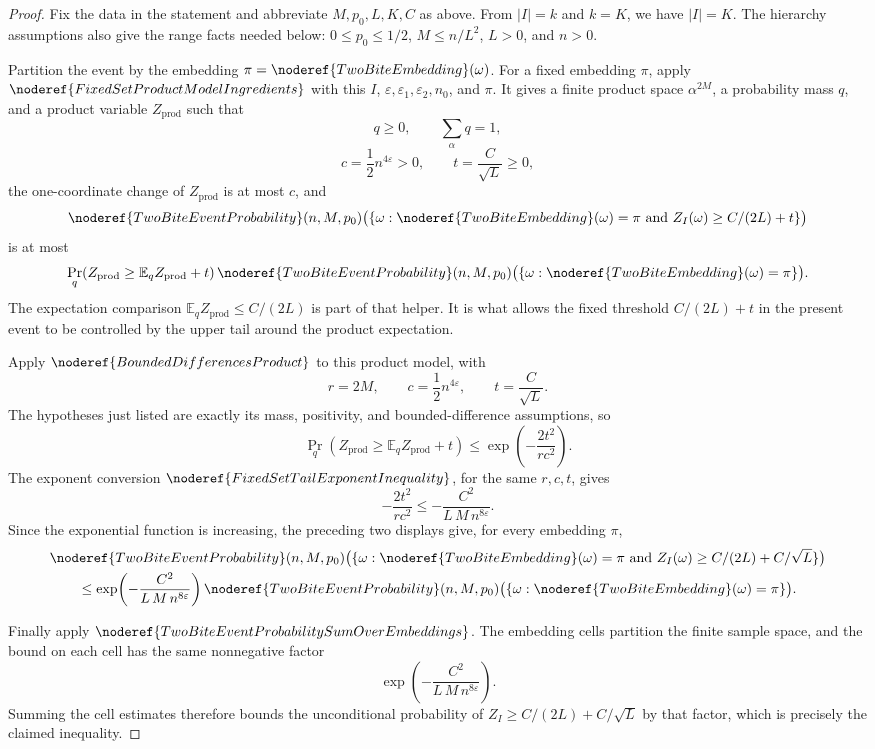 \begin{proof}
Fix the data in the statement and abbreviate \(M,p_0,L,K,C\) as above.  From
\(|I|=k\) and \(k=K\), we have \(|I|=K\).  The hierarchy assumptions also give
the range facts needed below: \(0\le p_0\le 1/2\), \(M\le n/L^2\), \(L>0\),
and \(n>0\).

Partition the event by the embedding
\(\pi=\noderef{TwoBiteEmbedding}(\omega)\).  For a fixed embedding \(\pi\),
apply \(\noderef{FixedSetProductModelIngredients}\) with this \(I\),
\(\varepsilon,\varepsilon_1,\varepsilon_2,n_0\), and \(\pi\).  It gives a
finite product space \(\alpha^{2M}\), a probability mass \(q\), and a product
variable \(Z_{\mathrm{prod}}\) such that
\[
q\ge0,\qquad \sum_{\alpha}q=1,
\]
\[
c=\frac12 n^{4\varepsilon}>0,\qquad t=\frac{C}{\sqrt L}\ge0,
\]
the one-coordinate change of \(Z_{\mathrm{prod}}\) is at most \(c\), and
\[
\noderef{TwoBiteEventProbability}(n,M,p_0)
 \bigl(\{\omega:\noderef{TwoBiteEmbedding}(\omega)=\pi
   \text{ and } Z_I(\omega)\ge C/(2L)+t\}\bigr)
\]
is at most
\[
\Pr_q\!\left(
Z_{\mathrm{prod}}\ge\mathbb E_qZ_{\mathrm{prod}}+t
\right)
\noderef{TwoBiteEventProbability}(n,M,p_0)
 \bigl(\{\omega:\noderef{TwoBiteEmbedding}(\omega)=\pi\}\bigr).
\]
The expectation comparison
\(\mathbb E_qZ_{\mathrm{prod}}\le C/(2L)\) is part of that helper.  It is what
allows the fixed threshold \(C/(2L)+t\) in the present event to be controlled
by the upper tail around the product expectation.

Apply \(\noderef{BoundedDifferencesProduct}\) to this product model, with
\[
r=2M,\qquad c=\frac12 n^{4\varepsilon},\qquad t=\frac{C}{\sqrt L}.
\]
The hypotheses just listed are exactly its mass, positivity, and
bounded-difference assumptions, so
\[
\Pr_q\!\left(
Z_{\mathrm{prod}}\ge\mathbb E_qZ_{\mathrm{prod}}+t
\right)
\le
\exp\!\left(-\frac{2t^2}{r c^2}\right).
\]
The exponent conversion
\(\noderef{FixedSetTailExponentInequality}\), for the same \(r,c,t\), gives
\[
-\frac{2t^2}{r c^2}
\le
-\frac{C^2}{L\,M\,n^{8\varepsilon}}.
\]
Since the exponential function is increasing, the preceding two displays give,
for every embedding \(\pi\),
\[
\begin{aligned}
&\noderef{TwoBiteEventProbability}(n,M,p_0)
 \bigl(\{\omega:\noderef{TwoBiteEmbedding}(\omega)=\pi
   \text{ and } Z_I(\omega)\ge C/(2L)+C/\sqrt L\}\bigr)\\
&\qquad\le
\exp\!\left(-\frac{C^2}{L\,M\,n^{8\varepsilon}}\right)
\noderef{TwoBiteEventProbability}(n,M,p_0)
 \bigl(\{\omega:\noderef{TwoBiteEmbedding}(\omega)=\pi\}\bigr).
\end{aligned}
\]

Finally apply \(\noderef{TwoBiteEventProbabilitySumOverEmbeddings}\).  The
embedding cells partition the finite sample space, and the bound on each cell
has the same nonnegative factor
\[
\exp\!\left(-\frac{C^2}{L\,M\,n^{8\varepsilon}}\right).
\]
Summing the cell estimates therefore bounds the unconditional probability of
\(Z_I\ge C/(2L)+C/\sqrt L\) by that factor, which is precisely the claimed
inequality.
\end{proof}
